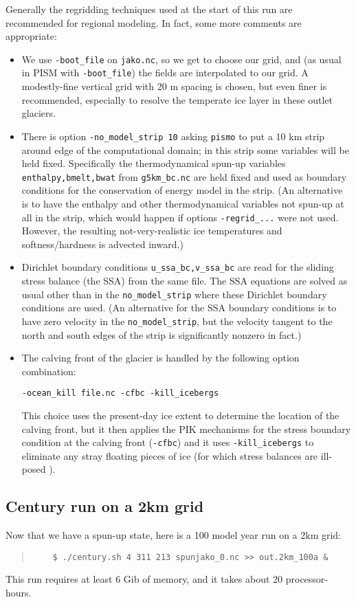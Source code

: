 Generally the regridding techniques used at the start of this run are recommended for regional modeling.  In fact, some more comments are appropriate:
\begin{itemize}
\item  We use \verb|-boot_file| on \verb|jako.nc|, so we get to choose our grid, and (as usual in PISM with \verb|-boot_file|) the fields are interpolated to our grid.  A modestly-fine vertical grid with 20 m spacing is chosen, but even finer is recommended, especially to resolve the temperate ice layer in these outlet glaciers.
\item There is option \verb|-no_model_strip 10| asking \verb|pismo| to put a 10 km strip around edge of the computational domain; in this strip some variables will be held fixed.  Specifically the thermodynamical spun-up variables \verb|enthalpy,bmelt,bwat| from \verb|g5km_bc.nc| are held fixed and used as boundary conditions for the conservation of energy model in the strip. (An alternative is to have the enthalpy and other thermodynamical variables not spun-up at all in the strip, which would happen if options \verb|-regrid_...| were not used.  However, the resulting not-very-realistic ice temperatures and softness/hardness is advected inward.)
\item Dirichlet boundary conditions \verb|u_ssa_bc,v_ssa_bc| are read for the sliding stress balance (the SSA) from the same file.  The SSA equations are solved as usual other than in the \verb|no_model_strip| where these Dirichlet boundary conditions are used.  (An alternative for the SSA boundary conditions is to have zero velocity in the \verb|no_model_strip|, but the velocity tangent to the north and south edges of the strip is significantly nonzero in fact.)
\item The calving front of the glacier is handled by the following option combination:

  \verb|-ocean_kill file.nc -cfbc -kill_icebergs|
  
\noindent This choice uses the present-day ice extent to determine the location of the calving front, but it then applies the PIK mechanisms for the stress boundary condition at the calving front (\verb|-cfbc|) and it uses \verb|-kill_icebergs| to eliminate any stray floating pieces of ice (for which stress balances are ill-posed \cite{Winkelmannetal2011}).
\end{itemize}

\subsection*{Century run on a 2km grid}
Now that we have a spun-up state, here is a 100 model year run on a 2km grid:
\begin{quote}\small
\begin{verbatim}
    $ ./century.sh 4 311 213 spunjako_0.nc >> out.2km_100a &
\end{verbatim}
\normalsize\end{quote}
This run requires at least 6 Gib of memory, and it takes about 20 processor-hours. %


